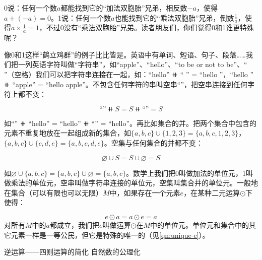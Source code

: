 \documentclass[b5paper]{ctexart}
\begin{document}
0说：任何一个数$a$都能找到它的“加法双胞胎”兄弟，相反数$-a$，使得$a + (-a) = 0$。1说：任何一个数$a$也能找到它的“乘法双胞胎”兄弟，倒数$\frac{1}{a}$，使得$a \times \frac{1}{a} = 1$，不过0没有“乘法双胞胎”兄弟。读者朋友们，你们觉得0和1谁更特殊呢？

像0和1这样“鹤立鸡群”的例子比比皆是。英语中有单词、短语、句子、段落……我们把一列英语字符叫做“字符串”，如``apple''、``hello''、``to be or not to be''、`` ''（空格）我们可以把字符串连接在一起，如：``hello'' $\doubleplus$ `` '' = ``hello ''，``hello '' $\doubleplus$ ``apple'' = ``hello apple''。不包含任何字符的串叫空串``''，把空串连接到任何字符上都不变：

\[
\text{``''} \doubleplus S = S \doubleplus \text{``''} = S
\]

如``'' $\doubleplus$ ``hello'' = ``hello'' $\doubleplus$ ``'' = ``hello''。再比如集合的并。把两个集合中包含的元素不重复地放在一起组成新的集合，如$\{a, b, c\} \cup \{1, 2, 3\} = \{a, b, c, 1, 2, 3\}$，$\{a, b, c\} \cup \{c, d, e\} = \{a, b, c, d, e\}$。空集与任何集合的并都不变：

\[
\varnothing \cup S = S \cup \varnothing = S
\]

如$\varnothing \cup \{a, b, c\} = \{a, b, c\} \cup \varnothing = \{a, b, c\}$。数学上我们把0叫做加法的单位元，1叫做乘法的单位元，空串叫做字符串连接的单位元，空集叫集合并的单位元。一般地在集合（可以有限也可以无限）$M$中，如果存在一个元素$e$，在某种二元运算$\odot$下使得：

\[
  e \odot a = a \odot e = a
\]
对所有$M$中的$a$都成立，我们把$e$叫做运算$\odot$在$M$中的单位元。单位元和集合中的其它元素一样是一等公民，但它是特殊的唯一的（见\cref{qn:unique-e}）。

逆运算——四则运算的简化
自然数的公理化

\begin{Exercise}[label={ex:zero}]
\end{Exercise}
\end{document}

